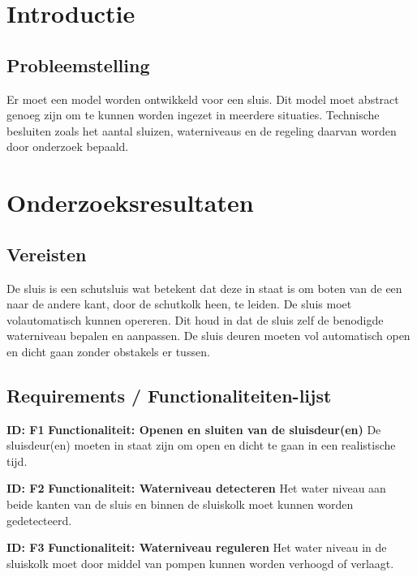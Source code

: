 \documentclass{article}
\begin{document}
\section{Introductie}
\subsection{Probleemstelling}
Er moet een model worden ontwikkeld voor een sluis. Dit model moet abstract genoeg zijn om te kunnen worden ingezet in meerdere situaties. Technische besluiten zoals het aantal sluizen, waterniveaus en de regeling daarvan worden door onderzoek bepaald.



\section{Onderzoeksresultaten}

\subsection{Vereisten}

De sluis is een schutsluis wat betekent dat deze in staat is om boten van de een naar de andere kant, door de schutkolk heen, te leiden. De sluis moet volautomatisch kunnen opereren. Dit houd in dat de sluis zelf de benodigde waterniveau bepalen en aanpassen. De sluis deuren moeten vol automatisch open en dicht gaan zonder obstakels er tussen.


\subsection{Requirements / Functionaliteiten-lijst}\label{sec:FuncList}
\textbf{ID: F1} \newline
\textbf{Functionaliteit: Openen en sluiten van de sluisdeur(en)} \newline
De sluisdeur(en) moeten in staat zijn om open en dicht te gaan in een realistische tijd. \newline

\textbf{ID: F2} \newline
\textbf{Functionaliteit: Waterniveau detecteren} \newline
Het water niveau aan beide kanten van de sluis en binnen de sluiskolk moet kunnen worden gedetecteerd. \newline

\textbf{ID: F3} \newline
\textbf{Functionaliteit: Waterniveau reguleren} \newline
Het water niveau in de sluiskolk moet door middel van pompen kunnen worden verhoogd of verlaagt. \newline
\end{document}
